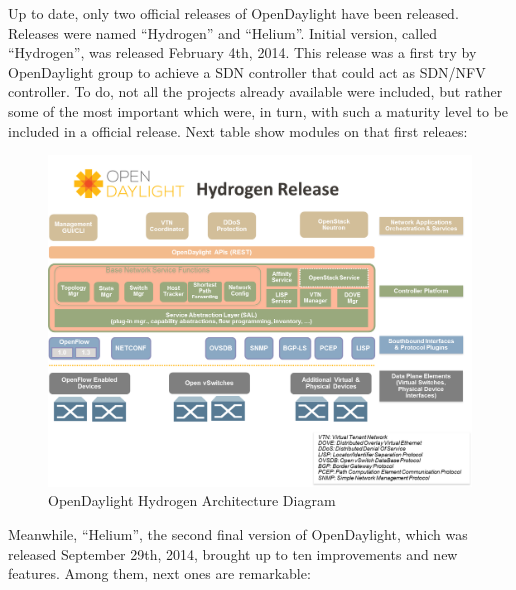 \documentclass[a4paper, 12pt]{book}
\begin{document}
Up to date, only two official releases of OpenDaylight have been released. Releases were named ``Hydrogen'' and ``Helium''. Initial version, called ``Hydrogen'', was released February 4th, 2014. This release was a first try by OpenDaylight group to achieve a SDN controller that could act as SDN/NFV controller. To do, not all the projects already available were included, but rather some of the most important which were, in turn, with such a maturity level to be included in a official release. Next table show modules on that first releaes:
\begin{center}
 \begin{figure}[H]
 \begin{center}
   \includegraphics[width=15cm]{img/odl-technologies-00.png}
   \caption{OpenDaylight Hydrogen Architecture Diagram}
   \label{fig:odl_tech_diagram}
 \end{center}
 \end{figure}
\end{center}
Meanwhile, ``Helium'', the second final version of OpenDaylight, which was released September 29th, 2014, brought up to ten improvements and new features. Among them, next ones are remarkable:
\end{document}
